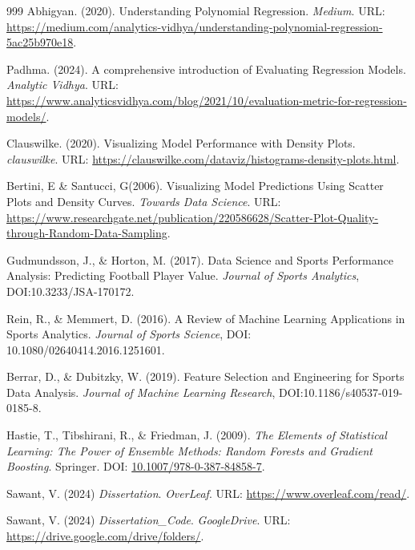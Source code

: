 \documentclass[12pt, a4paper,oneside]{book}
\numberwithin{equation}{section}
\begin{document}
\begin{thebibliography}{999}
Abhigyan. (2020). Understanding Polynomial Regression. \textit{Medium}. URL: \href{https://medium.com/analytics-vidhya/understanding-polynomial-regression-5ac25b970e18}{https://medium.com/analytics-vidhya/understanding-polynomial-regression-5ac25b970e18}.

Padhma. (2024). A comprehensive introduction of Evaluating Regression Models. \textit{Analytic Vidhya}. URL: \href{https://www.analyticsvidhya.com/blog/2021/10/evaluation-metric-for-regression-models/}{https://www.analyticsvidhya.com/blog/2021/10/evaluation-metric-for-regression-models/}.

Clauswilke. (2020). Visualizing Model Performance with Density Plots. \textit{clauswilke}. URL: \href{https://clauswilke.com/dataviz/histograms-density-plots.html}{https://clauswilke.com/dataviz/histograms-density-plots.html}.

Bertini, E \& Santucci, G(2006). Visualizing Model Predictions Using Scatter Plots and Density Curves. \textit{Towards Data Science}. URL: \href{ https://www.researchgate.net/publication/220586628_Give_Chance_a_Chance_Modeling_Density_to_Enhance_Scatter_Plot_Quality_through_Random_Data_Sampling }{ https://www.researchgate.net/publication/220586628/Scatter-Plot-Quality-through-Random-Data-Sampling}.

Gudmundsson, J., \& Horton, M. (2017). Data Science and Sports Performance Analysis: Predicting Football Player Value. \textit{Journal of Sports Analytics}, DOI:10.3233/JSA-170172.

Rein, R., \& Memmert, D. (2016). A Review of Machine Learning Applications in Sports Analytics. \textit{Journal of Sports Science}, DOI: 10.1080/02640414.2016.1251601.

Berrar, D., \& Dubitzky, W. (2019). Feature Selection and Engineering for Sports Data Analysis. \textit{Journal of Machine Learning Research}, DOI:10.1186/s40537-019-0185-8.

Hastie, T., Tibshirani, R., \& Friedman, J. (2009). \textit{The Elements of Statistical Learning: The Power of Ensemble Methods: Random Forests and Gradient Boosting}. Springer. DOI: \href{https://doi.org/10.1007/978-0-387-84858-7}{10.1007/978-0-387-84858-7}.

Sawant, V. (2024) \textit{Dissertation}. \textit{OverLeaf}. URL: \href{https://www.overleaf.com/read/wrzdrwsffdgb#a6a884}{https://www.overleaf.com/read/}.

Sawant, V. (2024) \textit{Dissertation\_Code}. \textit{GoogleDrive}. URL: \href{https://drive.google.com/drive/folders/1gFuf9aL9WJIk053SfPqR5f_OKVpolKUz?usp=drive_link}{https://drive.google.com/drive/folders/}.

\end{thebibliography}
\end{document}
